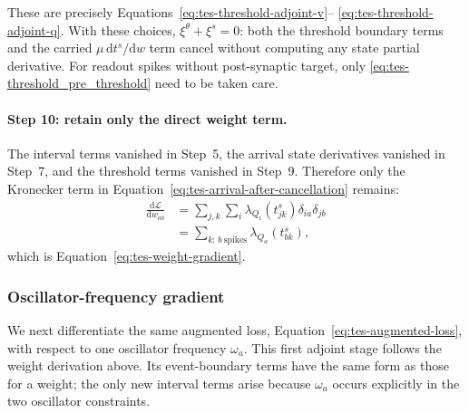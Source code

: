 These are precisely Equations~\eqref{eq:tes-threshold-adjoint-v}--
\eqref{eq:tes-threshold-adjoint-q}. With these choices,
$\xi^\theta + \xi^s=0$: both the threshold boundary terms and the carried $\mu\,\mathrm dt^s/\mathrm dw$ term cancel without computing any state partial derivative. For readout spikes without post-synaptic target, only \eqref{eq:tes-threshold_pre_threshold} need to be taken care.

\paragraph{Step 10: retain only the direct weight term.}
The interval terms vanished in Step~5, the arrival state derivatives vanished
in Step~7, and the threshold terms vanished in Step~9. Therefore only the
Kronecker term in Equation~\eqref{eq:tes-arrival-after-cancellation} remains:
\begin{align}
    \frac{\mathrm d\mathcal L}{\mathrm dw_{ab}}
      &=\sum_{j,k}\sum_i
        \lambda_{Q_i}(t^s_{jk})
        \delta_{ia}\delta_{jb}
        \nonumber\\
      &=\sum_{k:\,b\ \mathrm{spikes}}
        \lambda_{Q_a}(t^s_{bk}),
    \label{eq:tes-weight-gradient-derived}
\end{align}
which is Equation~\eqref{eq:tes-weight-gradient}.

\subsubsection{Oscillator-frequency gradient}
\label{sec:tes-omega-gradient-derivation}

We next differentiate the same augmented loss,
Equation~\eqref{eq:tes-augmented-loss}, with respect to one oscillator
frequency $\omega_a$. This first adjoint stage follows the weight derivation
above. Its event-boundary terms have the same form as those for a weight; the
only new interval terms arise because $\omega_a$ occurs explicitly in the two
oscillator constraints.

